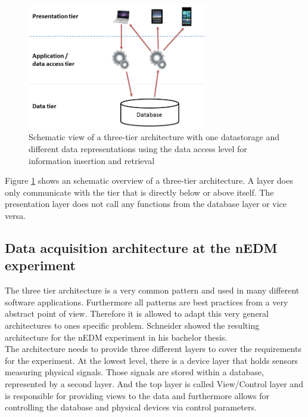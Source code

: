   
\begin{figure}[h!]
  \centering
      \includegraphics[width=0.7\textwidth]{images/3TierArchitecture.png}
  \caption{Schematic view of a three-tier architecture with one datastorage and different data representations using the data access level for information insertion and retrieval}
  \label{figure:3TierArchitecture}
\end{figure}

Figure \ref{figure:3TierArchitecture} shows an schematic overview of a three-tier architecture. A layer does only communicate with the tier that is directly below or above itself. The presentation layer does not call any functions from the database layer or vice versa.
  
\subsection{Data acquisition architecture at the nEDM experiment}
The three tier architecture is a very common pattern and used in many different software applications. Furthermore all patterns are best practices from a very abstract point of view. Therefore it is allowed to adapt this very general architectures to ones specific problem. Schneider showed the resulting architecture for the nEDM experiment in his bachelor thesis\cite{Schneider12}.\\

The architecture needs to provide three different layers to cover the requirements for the experiment. At the lowest level, there is a device layer that holds sensors measuring physical signals. Those signals are stored within a database, represented by a second layer. And the top layer is called View/Control layer and is responsible for providing views to the data and furthermore allows for controlling the database and physical devices via control parameters.
  
